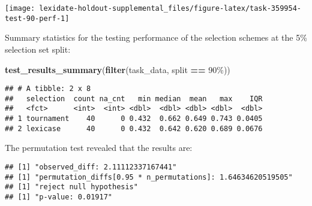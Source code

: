 \documentclass[
]{book}
\newenvironment{Shaded}{\begin{snugshade}}{\end{snugshade}}
\newcommand{\AttributeTok}[1]{\textcolor[rgb]{0.13,0.29,0.53}{#1}}
\newcommand{\DecValTok}[1]{\textcolor[rgb]{0.00,0.00,0.81}{#1}}
\newcommand{\FunctionTok}[1]{\textcolor[rgb]{0.13,0.29,0.53}{\textbf{#1}}}
\newcommand{\NormalTok}[1]{#1}
\newcommand{\OtherTok}[1]{\textcolor[rgb]{0.56,0.35,0.01}{#1}}
\newcommand{\SpecialCharTok}[1]{\textcolor[rgb]{0.81,0.36,0.00}{\textbf{#1}}}
\newcommand{\StringTok}[1]{\textcolor[rgb]{0.31,0.60,0.02}{#1}}
\begin{document}
\texttt{[image: lexidate-holdout-supplemental\_files/figure-latex/task-359954-test-90-perf-1]}

Summary statistics for the testing performance of the selection schemes at the 5\% selection set split:

\begin{Shaded}
\begin{Highlighting}[]
\FunctionTok{test\_results\_summary}\NormalTok{(}\FunctionTok{filter}\NormalTok{(task\_data, split }\SpecialCharTok{==} \StringTok{\textquotesingle{}90\%\textquotesingle{}}\NormalTok{))}
\end{Highlighting}
\end{Shaded}

\begin{verbatim}
## # A tibble: 2 x 8
##   selection  count na_cnt   min median  mean   max    IQR
##   <fct>      <int>  <int> <dbl>  <dbl> <dbl> <dbl>  <dbl>
## 1 tournament    40      0 0.432  0.662 0.649 0.743 0.0405
## 2 lexicase      40      0 0.432  0.642 0.620 0.689 0.0676
\end{verbatim}

The permutation test revealed that the results are:

\begin{Shaded}
\end{Shaded}

\begin{verbatim}
## [1] "observed_diff: 2.11112337167441"
## [1] "permutation_diffs[0.95 * n_permutations]: 1.64634620519505"
## [1] "reject null hypothesis"
## [1] "p-value: 0.01917"
\end{verbatim}
\end{document}
